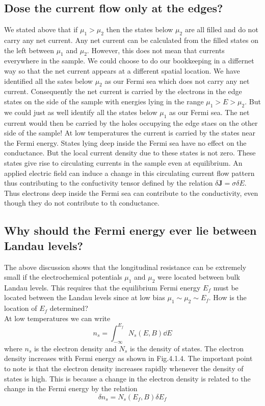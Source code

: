 \documentclass[11pt,a4paper]{book}
\theoremstyle{plain}
\theoremstyle{definition}
\theoremstyle{remark}
\renewcommand{\vec}[1]{\boldsymbol{#1}}
\begin{document}
\subsection{Dose the current flow only at the edges?}
We stated above that if $\mu_1>\mu_2$ then the states below $\mu_2$ are all filled and do not carry any net current. Any net current can be calculated from the filled states on the left between $\mu_1$ and $\mu_2$. However, this does not mean that currents everywhere in the sample. We could choose to do our bookkeeping in a differnet way so that the net current appears at a different spatial location. We have identified all the sates below $\mu_2$ as our Fermi sea which does not carry any net current. Consequently the net current is carried by the electrons in the edge states on the side of the sample with energies lying in the range $\mu_1 > E > \mu_2$. But we could just as well identify all the states below $\mu_1$ as our Fermi sea. The net current would then be carried by the holes occupying the edge staes on the other side of the sample!
At low temperatures the current is carried by the states near the Fermi energy. States lying deep inside the Fermi sea have no effect on the conductance. But the local current density due to these states is not zero. These states give rise to circulating currents in the sample even at equilibrium. An applied electric field can induce a change in this circulating current flow pattern thus contributing to the confuctivity tensor defined by the relation $\delta \vec{J} = \sigma \delta E$. Thus electrons deep inside the Fermi sea can contribute to the conductivity, even though they do not contribute to th conductance.
\subsection{Why should the Fermi energy ever lie between Landau levels?}
The above discussion shows that the longitudinal resistance can be extremely small if the electrochemical potentials $\mu_1$ and $\mu_2$ were located between bulk Landau levels. This requires that the equilibrium Fermi energy $E_f$ must be located between the Landau levels since at low bias $\mu_1 \sim \mu_2 \sim E_f$. How is the location of $E_f$ determined?\\
At low temperatures we can write
\begin{equation}
    n_s = \int^{E_f}_{-\infty} N_s(E,B) \dd E
\end{equation}
where $n_s$ is the electron density and $N_s$ is the density of states. The electron density increases with Fermi energy as shown in Fig.4.1.4. The important point to note is that the electron density increases rapidly whenever the density of states is high. This is because a change in the electron density is related to the change in the Fermi energy by the relation
\begin{equation}
    \delta n_s = N_s(E_f,B) \delta E_f
\end{equation}
\end{document}
